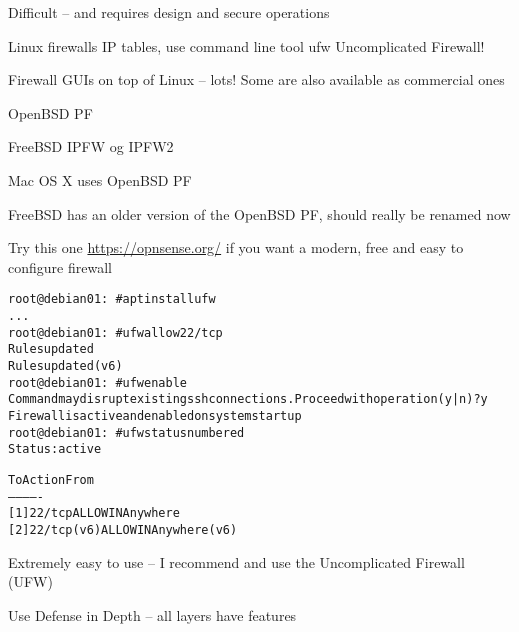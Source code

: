 \documentclass[Screen16to9,17pt]{foils}
\begin{document}
\vskip 5mm
\centerline{Difficult -- and requires design and secure operations}



\begin{list2}
\item Linux firewalls IP tables, use command line tool ufw Uncomplicated Firewall!
\item Firewall GUIs on top of Linux -- lots! Some are also available as commercial ones
\item OpenBSD PF
\item FreeBSD IPFW og IPFW2 
\item Mac OS X uses OpenBSD PF
\item FreeBSD has an older version of the OpenBSD PF, should really be renamed now
\end{list2}

Try this one \url{https://opnsense.org/} if you want a modern, free and easy to configure firewall


\begin{alltt}\small
root@debian01:~# apt install ufw
...
root@debian01:~# ufw allow 22/tcp
Rules updated
Rules updated (v6)
root@debian01:~# ufw enable
Command may disrupt existing ssh connections. Proceed with operation (y|n)? y
Firewall is active and enabled on system startup
root@debian01:~# ufw status numbered
Status: active

     To                         Action      From
     --                         ------      ----
[ 1] 22/tcp                     ALLOW IN    Anywhere
[ 2] 22/tcp (v6)                ALLOW IN    Anywhere (v6)
\end{alltt}

\begin{list2}
\item Extremely easy to use -- I recommend and use the Uncomplicated Firewall (UFW)
\end{list2}





\centerline{Use Defense in Depth -- all layers have features}



\end{document}
